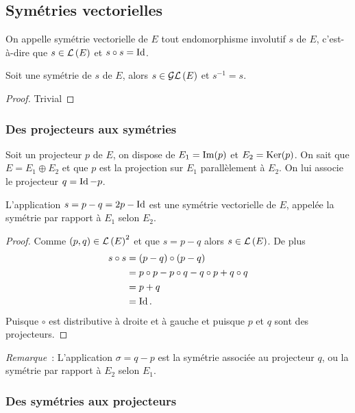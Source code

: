 \subsection{Symétries vectorielles}

\begin{defdef}
  On appelle symétrie vectorielle de \(E\) tout endomorphisme involutif \(s\) de 
  \(E\), c'est-à-dire que \(s \in \mathcal{L}\left(E\right)\) et \(s \circ s = \operatorname{Id}\).
\end{defdef}

\begin{prop}
  Soit une symétrie de \(s\) de \(E\), alors \(s \in \mathcal{GL}\left(E\right)\) et \(s^{-1}=s\).
\end{prop}
\begin{proof}
  Trivial
\end{proof}

\subsubsection{Des projecteurs aux symétries}

Soit un projecteur \(p\) de \(E\), on dispose de \(E_1=\operatorname{Im}(p)\) et 
\(E_2=\operatorname{Ker}(p)\). On sait que \(E=E_1 \oplus E_2\) et que \(p\) est la projection 
sur \(E_1\) parallèlement à \(E_2\). On lui associe le projecteur \(q=\operatorname{Id}-p\).

\begin{prop}
  L'application \(s=p-q=2p-\operatorname{Id}\) est une symétrie vectorielle de \(E\), appelée 
  la symétrie par rapport à \(E_1\) selon \(E_2\).
\end{prop}
\begin{proof}
  Comme \((p,q) \in \mathcal{L}\left(E\right)^2\) et que \(s=p-q\) alors \(s \in \mathcal{L}\left(E\right)\). De 
  plus
  \begin{align}
    s \circ s &=(p-q) \circ (p-q)\\
    &=p \circ p -p \circ q -q \circ p +q \circ q\\
    &=p+q\\
    &=\operatorname{Id}.
  \end{align}
  Puisque \(\circ\) est distributive à droite et à gauche et puisque \(p\) et 
  \(q\) sont des projecteurs.
\end{proof}

\emph{Remarque}~: L'application \(\sigma=q-p\) est la symétrie associée au 
projecteur \(q\), ou la symétrie par rapport à \(E_2\) selon \(E_1\).

\subsubsection{Des symétries aux projecteurs}

